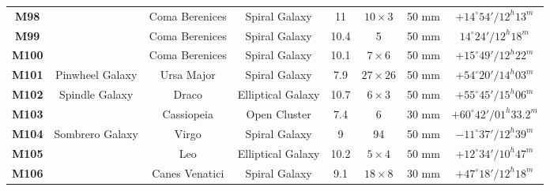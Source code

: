 \documentclass[a4paper,12pt]{extarticle}
\begin{document}
\begin{table}[H]
\begin{tabular}{clcccccc}
\rowcolor[HTML]{00FFFF} 
\textbf{M98}  &                                                                                                                       & Coma Berenices & Spiral Galaxy     & 11 & $10\times3$  & 50 mm     & $+14^\circ 54'/ 12^h 13^m$   \\
\rowcolor[HTML]{00FFFF} 
\textbf{M99}  &                                                                                                                       & Coma Berenices & Spiral Galaxy     & 10.4  & 5    & 50 mm     & $14^\circ  24'/ 12^h 18^m$   \\
\rowcolor[HTML]{00FFFF} 
\textbf{M100} &                                                                                                                       & Coma Berenices & Spiral Galaxy     & 10.1  & $7\times6$   & 50 mm     & $+15^\circ 49'/ 12^h 22^m$   \\
\rowcolor[HTML]{00FFFF} 
\textbf{M101} & \multicolumn{1}{c}{\cellcolor[HTML]{00FFFF}Pinwheel Galaxy}                                                           & Ursa Major     & Spiral Galaxy     & 7.9  & $27\times26$ & 50 mm     & $+54^\circ 20'/ 14^h 03^m$   \\
\rowcolor[HTML]{F3F3F3} 
\textbf{M102} & \multicolumn{1}{c}{\cellcolor[HTML]{F3F3F3}Spindle Galaxy}                                                            & Draco          & Elliptical Galaxy & 10.7  & $6\times 3$  & 50 mm     & $+55^\circ 45'/ 15^h 06^m$   \\
\rowcolor[HTML]{D9EAD3} 
\textbf{M103} &                                                                                                                       & Cassiopeia     & Open Cluster      & 7.4  & 6    & 30 mm     & $+60^\circ 42'/ 01^h 33.2^m$ \\
\rowcolor[HTML]{00FFFF} 
\textbf{M104} & \multicolumn{1}{c}{\cellcolor[HTML]{00FFFF}Sombrero Galaxy}                                                           & Virgo          & Spiral Galaxy     & 9  & 94   & 50 mm     & $-11^\circ 37'/ 12^h 39^m$   \\
\rowcolor[HTML]{F3F3F3} 
\textbf{M105} &                                                                                                                       & Leo            & Elliptical Galaxy & 10.2  & $5\times4$  & 50 mm     & $+12^\circ 34'/ 10^h 47^m$   \\
\rowcolor[HTML]{00FFFF} 
\textbf{M106} &                                                                                                                       & Canes Venatici & Spiral Galaxy     & 9.1 & $18\times8$  & 30 mm     & $+47^\circ 18'/ 12^h 18^m$   \\

\end{tabular}
\end{table}
\end{document}
